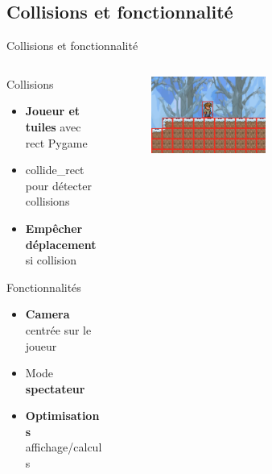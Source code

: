 \documentclass[aspectratio=169]{beamer}
\begin{document}
\subsection{Collisions et fonctionnalité}

\begin{frame}{Collisions et fonctionnalité}
    \begin{columns}
        \centering
        \begin{column}{0.5\textwidth}
            \centering
            \begin{block}{Collisions}
                \centering
                \begin{itemize}
                    \item \textbf{Joueur et tuiles} avec rect Pygame\\
                    \item collide\_rect pour détecter collisions
                    \item \textbf{Empêcher déplacement} si collision\\
                \end{itemize}
            \end{block}
            \begin{block}{Fonctionnalités}
                \centering
                \begin{itemize}
                    \item \textbf{Camera} centrée sur le joueur
                    \item Mode \textbf{spectateur}
                    \item \textbf{Optimisations} affichage/calculs
                \end{itemize}
            \end{block}
        \end{column}
        \begin{column}{0.5\textwidth}
            \centering
            \begin{figure}
                \centering
                \captionsetup{format=sanslabel}
                \includegraphics[width=0.5\textwidth]{assets/hit_box.png}

\end{figure}
\end{column}
\end{columns}
\end{frame}
\end{document}
